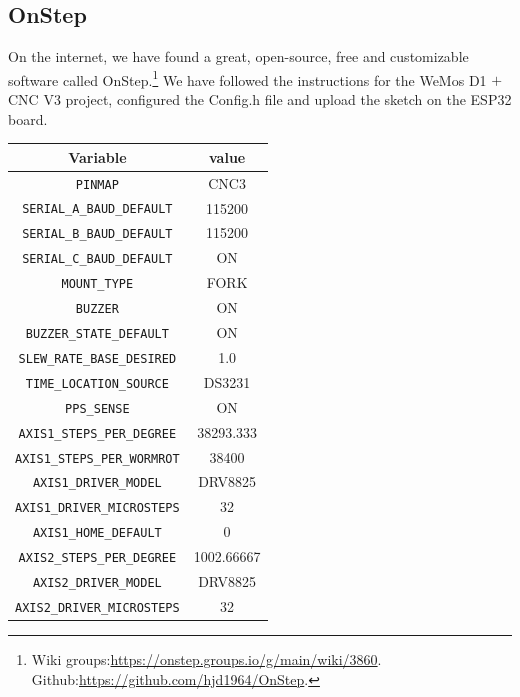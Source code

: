 \documentclass{article}
\begin{document}
\begin{multicols}{2}
        \subsection{OnStep}
        On the internet, we have found a great, open-source, free and customizable software called OnStep.\footnote{Wiki groups:\url{https://onstep.groups.io/g/main/wiki/3860}.\\Github:\url{https://github.com/hjd1964/OnStep}.}
        We have followed the instructions for the WeMos D1 \(+\) CNC V3 project, configured the Config.h file and upload the sketch on the ESP32 board.
        \begin{minipage}
            {0.5\textwidth}
            \centering
            \begin{tabular}{cc}
                Variable & value \\
                \hline
                \texttt{PINMAP} & CNC3\\
                \texttt{SERIAL\_A\_BAUD\_DEFAULT} & 115200 \\
                \texttt{SERIAL\_B\_BAUD\_DEFAULT} & 115200 \\
                \texttt{SERIAL\_C\_BAUD\_DEFAULT} &  ON \\
                \texttt{MOUNT\_TYPE} & FORK \\
                \texttt{BUZZER} & ON\\
                \texttt{BUZZER\_STATE\_DEFAULT} & ON\\
                \texttt{SLEW\_RATE\_BASE\_DESIRED} & 1.0\\
                \texttt{TIME\_LOCATION\_SOURCE} & DS3231 \\
                \texttt{PPS\_SENSE} & ON \\
                \texttt{AXIS1\_STEPS\_PER\_DEGREE} & 38293.333 \\
                \texttt{AXIS1\_STEPS\_PER\_WORMROT} & 38400\\ 
                \texttt{AXIS1\_DRIVER\_MODEL} & DRV8825\\
                \texttt{AXIS1\_DRIVER\_MICROSTEPS} & 32 \\
                \texttt{AXIS1\_HOME\_DEFAULT} & 0\\
                \texttt{AXIS2\_STEPS\_PER\_DEGREE} & 1002.66667 \\
                \texttt{AXIS2\_DRIVER\_MODEL} & DRV8825 \\
                \texttt{AXIS2\_DRIVER\_MICROSTEPS} & 32 \\

\end{tabular}
\end{minipage}
\end{multicols}
\end{document}
